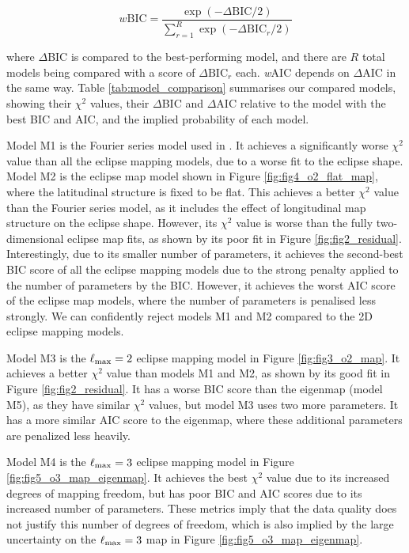 \documentclass[twocolumn]{aastex631}
\begin{document}
\begin{equation}
    w\mathrm{BIC}=\frac{\exp \left(-\Delta\mathrm{BIC} / 2\right)}{\sum_{r=1}^R \exp \left(-\Delta\mathrm{BIC}_{r} / 2\right)}
\end{equation}

where $\Delta$BIC is compared to the best-performing model, and there are $R$ total models being compared with a score of $\Delta\mathrm{BIC}_{r}$ each. \textit{w}AIC depends on $\Delta$AIC in the same way. Table \ref{tab:model_comparison} summarises our compared models, showing their $\chi^{2}$ values, their $\Delta$BIC and $\Delta$AIC relative to the model with the best BIC and AIC, and the implied probability of each model.

Model M1 is the Fourier series model used in \citet{bell2023wasp43b}. It achieves a significantly worse $\chi^{2}$ value than all the eclipse mapping models, due to a worse fit to the eclipse shape. Model M2 is the eclipse map model shown in Figure \ref{fig:fig4_o2_flat_map}, where the latitudinal structure is fixed to be flat. This achieves a better $\chi^{2}$ value than the Fourier series model, as it includes the effect of longitudinal map structure on the eclipse shape. However, its $\chi^{2}$ value is worse than the fully two-dimensional eclipse map fits, as shown by its poor fit in Figure \ref{fig:fig2_residual}. Interestingly, due to its smaller number of parameters, it achieves the second-best BIC score of all the eclipse mapping models due to the strong penalty applied to the number of parameters by the BIC. However, it achieves the worst AIC score of the eclipse map models, where the number of parameters is penalised less strongly. We can confidently reject models M1 and M2 compared to the 2D eclipse mapping models.

Model M3 is the $\ell_{\rm max}=2$ eclipse mapping model in Figure \ref{fig:fig3_o2_map}. It achieves a better $\chi^{2}$ value than models M1 and M2, as shown by its good fit in Figure \ref{fig:fig2_residual}. It has a worse BIC score than the eigenmap (model M5), as they have similar $\chi^{2}$ values, but model M3 uses two more parameters. It has a more similar AIC score to the eigenmap, where these additional parameters are penalized less heavily.

Model M4 is the $\ell_{\rm max}=3$ eclipse mapping model in Figure \ref{fig:fig5_o3_map_eigenmap}. It achieves the best $\chi^{2}$ value due to its increased degrees of mapping freedom, but has poor BIC and AIC scores due to its increased number of parameters. These metrics imply that the data quality does not justify this number of degrees of freedom, which is also implied by the large uncertainty on the $\ell_{\rm max}=3$ map in Figure \ref{fig:fig5_o3_map_eigenmap}.
\end{document}
